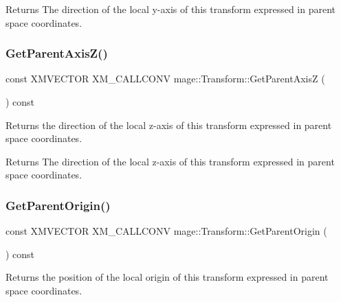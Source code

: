 \begin{DoxyReturn}{Returns}
The direction of the local y-\/axis of this transform expressed in parent space coordinates. 
\end{DoxyReturn}
\mbox{\label{classmage_1_1_transform_ab5ce18e39ad529b2e87ff0df1125f076}} 
\subsubsection{\texorpdfstring{Get\+Parent\+Axis\+Z()}{GetParentAxisZ()}}
{\footnotesize\ttfamily const X\+M\+V\+E\+C\+T\+OR X\+M\+\_\+\+C\+A\+L\+L\+C\+O\+NV mage\+::\+Transform\+::\+Get\+Parent\+AxisZ (\begin{DoxyParamCaption}{ }\end{DoxyParamCaption}) const\hspace{0.3cm}{\ttfamily [noexcept]}}

Returns the direction of the local z-\/axis of this transform expressed in parent space coordinates.

\begin{DoxyReturn}{Returns}
The direction of the local z-\/axis of this transform expressed in parent space coordinates. 
\end{DoxyReturn}
\mbox{\label{classmage_1_1_transform_ac781a4843051cdc9b5078dbc641707d1}} 
\subsubsection{\texorpdfstring{Get\+Parent\+Origin()}{GetParentOrigin()}}
{\footnotesize\ttfamily const X\+M\+V\+E\+C\+T\+OR X\+M\+\_\+\+C\+A\+L\+L\+C\+O\+NV mage\+::\+Transform\+::\+Get\+Parent\+Origin (\begin{DoxyParamCaption}{ }\end{DoxyParamCaption}) const\hspace{0.3cm}{\ttfamily [noexcept]}}

Returns the position of the local origin of this transform expressed in parent space coordinates.

